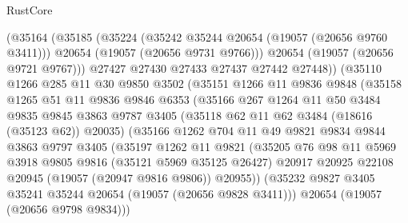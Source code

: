 \begin{lexlean}{RustCore}
\begin{coremodule}
                  (@35164
                    (@35185
                      (@35224
                        (@35242 @35244 @20654 (@19057 (@20656 @9760 @3411)))
                        @20654
                        (@19057 (@20656 @9731 @9766)))
                      @20654
                      (@19057 (@20656 @9721 @9767)))
                    @27427
                    @27430
                    @27433
                    @27437
                    @27442
                    @27448))
                (@35110
                  @1266
                  @285
                  @11
                  @30
                  @9850
                  @3502
                  (@35151
                    @1266
                    @11
                    @9836
                    @9848
                    (@35158
                      @1265
                      @51
                      @11
                      @9836
                      @9846
                      @6353
                      (@35166
                        @267
                        @1264
                        @11
                        @50
                        @3484
                        @9835
                        @9845
                        @3863
                        @9787
                        @3405
                        (@35118 @62 @11 @62 @3484 (@18616 (@35123 @62)) @20035)
                        (@35166
                          @1262
                          @704
                          @11
                          @49
                          @9821
                          @9834
                          @9844
                          @3863
                          @9797
                          @3405
                          (@35197
                            @1262
                            @11
                            @9821
                            (@35205
                              @76
                              @98
                              @11
                              @5969
                              @3918
                              @9805
                              @9816
                              (@35121 @5969 @35125 @26427)
                              @20917
                              @20925
                              @22108
                              @20945
                              (@19057 (@20947 @9816 @9806))
                              @20955))
                          (@35232 @9827 @3405 @35241 @35244 @20654 (@19057 (@20656 @9828 @3411)))
                          @20654
                          (@19057 (@20656 @9798 @9834)))

\end{coremodule}
\end{lexlean}
